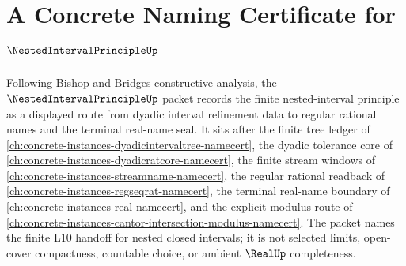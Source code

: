 \chapter{A Concrete Naming Certificate for $\NestedIntervalPrincipleUp$}
\label{ch:concrete-instances-nested-interval-principle-namecert}

Following Bishop and Bridges constructive analysis, the $\NestedIntervalPrincipleUp$ packet records the finite nested-interval principle as a displayed route from dyadic interval refinement data to regular rational names and the terminal real-name seal. It sits after the finite tree ledger of \autoref{ch:concrete-instances-dyadicintervaltree-namecert}, the dyadic tolerance core of \autoref{ch:concrete-instances-dyadicratcore-namecert}, the finite stream windows of \autoref{ch:concrete-instances-streamname-namecert}, the regular rational readback of \autoref{ch:concrete-instances-regseqrat-namecert}, the terminal real-name boundary of \autoref{ch:concrete-instances-real-namecert}, and the explicit modulus route of \autoref{ch:concrete-instances-cantor-intersection-modulus-namecert}. The packet names the finite L10 handoff for nested closed intervals; it is not selected limits, open-cover compactness, countable choice, or ambient $\RealUp$ completeness.

